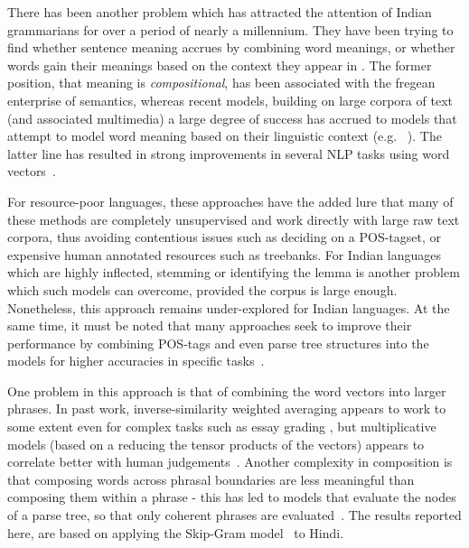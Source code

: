 There has been another problem which has attracted the attention of Indian grammarians for over a period of nearly a millennium. They have been trying to find whether sentence meaning accrues by combining word meanings, or whether words gain their meanings based on the context they appear in \cite{Matilal:90}.  The former position, that meaning is {\em compositional}, has been associated with the fregean enterprise of semantics, whereas recent models, building on large corpora of text (and associated multimedia) a large degree of success has accrued to models that attempt to model word meaning based on their linguistic context (e.g. ~\cite{Landauer:97}). The latter line has resulted in strong improvements in several NLP tasks using word vectors~\cite{Collobert:08,Turian:10,Mikolov:13a,Socher:13}.

For resource-poor languages, these approaches have the added lure that many of these methods are completely unsupervised and work directly with large raw text corpora, thus avoiding contentious issues such as deciding on a POS-tagset, or expensive human annotated resources such as treebanks.  For Indian languages which are highly inflected, stemming or identifying the lemma is another problem
which such models can overcome, provided the corpus is large enough. Nonetheless, this approach remains under-explored for Indian languages. At the same time, it must be noted that many approaches seek to improve their performance by combining POS-tags and even parse tree structures into the models for higher accuracies in specific tasks~\cite{Socher:13}. 

One problem in this approach is that of  combining the word vectors into larger phrases. In past work, inverse-similarity weighted averaging appears to work to some extent even for complex tasks such as essay grading \cite{Landauer:03}, but multiplicative models (based on a reducing the tensor products of the vectors) appears to correlate better with human judgements~\cite{Mitchell:08,Socher:13}.
Another complexity in composition is that composing words across phrasal boundaries are less meaningful than composing them within a phrase - this has led to models that evaluate the nodes of a parse tree, so that only coherent phrases are evaluated~\cite{Socher:13}. The results reported here, are based on applying the Skip-Gram  model~\cite{Mikolov:13b} to Hindi. 

